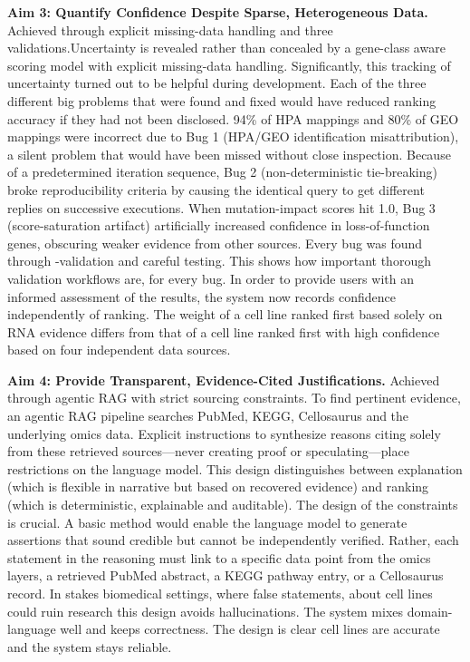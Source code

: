\documentclass[author={Karen Coutinho, Ishaan Bhalla, Aman Raj, Dixit Kaloorani Malarmannan},
                supervisor={Dr. Daniel D'Andrea},
                degree={MSc},
                title={CellSelector Omics: A Multi-Omics Recommendation System for Cell Line Selection},
                subtitle={},
                type={},
                year={2026}]{dissertation}
\begin{document}
{\bf Aim 3: Quantify Confidence Despite Sparse, Heterogeneous Data.} Achieved through explicit missing-data handling and three validations.Uncertainty is revealed rather than concealed by a gene-class aware scoring model with explicit missing-data handling. Significantly, this tracking of uncertainty turned out to be helpful during development. Each of the three different big problems that were found and fixed would have reduced ranking accuracy if they had not been disclosed. 94\% of HPA mappings and 80\% of GEO mappings were incorrect due to Bug 1 (HPA/GEO identification misattribution), a silent problem that would have been missed without close inspection. Because of a predetermined iteration sequence, Bug 2 (non-deterministic tie-breaking) broke reproducibility criteria by causing the identical query to get different replies on successive executions. When mutation-impact scores hit 1.0, Bug 3 (score-saturation artifact) artificially increased confidence in loss-of-function genes, obscuring weaker evidence from other sources. Every bug was found through -validation and careful testing. This shows how important thorough validation workflows are, for every bug. In order to provide users with an informed assessment of the results, the system now records confidence independently of ranking. The weight of a cell line ranked first based solely on RNA evidence differs from that of a cell line ranked first with high confidence based on four independent data sources.

{\bf Aim 4: Provide Transparent, Evidence-Cited Justifications.} Achieved through agentic RAG with strict sourcing constraints. To find pertinent evidence, an agentic RAG pipeline searches PubMed, KEGG, Cellosaurus and the underlying omics data. Explicit instructions to synthesize reasons citing solely from these retrieved sources—never creating proof or speculating—place restrictions on the language model. This design distinguishes between explanation (which is flexible in narrative but based on recovered evidence) and ranking (which is deterministic, explainable and auditable). The design of the constraints is crucial. A basic method would enable the language model to generate assertions that sound credible but cannot be independently verified. Rather, each statement in the reasoning must link to a specific data point from the omics layers, a retrieved PubMed abstract, a KEGG pathway entry, or a Cellosaurus record. In stakes biomedical settings, where false statements, about cell lines could ruin research this design avoids hallucinations. The system mixes domain- language well and keeps correctness. The design is clear cell lines are accurate and the system stays reliable.
\end{document}
